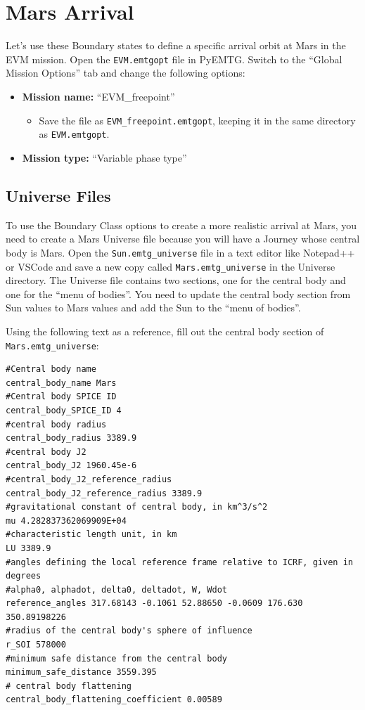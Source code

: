 \documentclass[11pt]{article}
\begin{document}
\section{Mars Arrival}
\label{sec:mars_arrival}

Let’s use these Boundary states to define a specific arrival orbit at Mars in the EVM mission. Open the \texttt{EVM.emtgopt} file in PyEMTG. Switch to the ``Global Mission Options'' tab and change the following options:

\begin{itemize}
	\item \textbf{Mission name:} ``EVM\_freepoint''
	\begin{itemize}
		\item Save the file as \texttt{EVM\_freepoint.emtgopt}, keeping it in the same directory as \texttt{EVM.emtgopt}.
	\end{itemize}
	\item \textbf{Mission type:} ``Variable phase type''
\end{itemize}

\subsection{Universe Files}
\label{sec:universe_files}

To use the Boundary Class options to create a more realistic arrival at Mars, you need to create a Mars Universe file because you will have a Journey whose central body is Mars. Open the \texttt{Sun.emtg\_universe} file in a text editor like Notepad++ or VSCode and save a new copy called \texttt{Mars.emtg\_universe} in the Universe directory. The Universe file contains two sections, one for the central body and one for the ``menu of bodies''. You need to update the central body section from Sun values to Mars values and add the Sun to the ``menu of bodies''.

\noindent Using the following text as a reference, fill out the central body section of \texttt{Mars.emtg\_universe}:

\begin{lstlisting}
#Central body name
central_body_name Mars
#Central body SPICE ID
central_body_SPICE_ID 4
#central body radius
central_body_radius 3389.9
#central body J2
central_body_J2 1960.45e-6
#central_body_J2_reference_radius
central_body_J2_reference_radius 3389.9
#gravitational constant of central body, in km^3/s^2
mu 4.282837362069909E+04
#characteristic length unit, in km
LU 3389.9
#angles defining the local reference frame relative to ICRF, given in degrees
#alpha0, alphadot, delta0, deltadot, W, Wdot
reference_angles 317.68143 -0.1061 52.88650 -0.0609 176.630 350.89198226
#radius of the central body's sphere of influence
r_SOI 578000
#minimum safe distance from the central body
minimum_safe_distance 3559.395
# central body flattening
central_body_flattening_coefficient 0.00589
\end{lstlisting}
\end{document}

